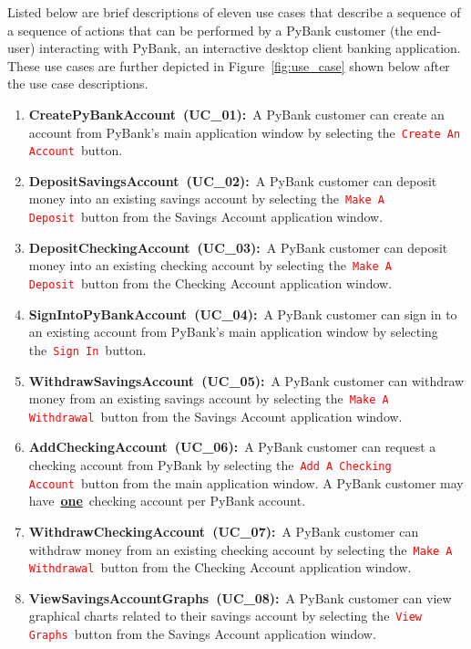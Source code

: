 Listed below are brief descriptions of eleven use cases that describe a sequence of a sequence of actions that can be performed by a PyBank customer (the end-user) interacting with PyBank, an interactive desktop client banking application. These use cases are further depicted in Figure~\ref{fig:use_case} shown below after the use case descriptions.

\begin{enumerate}[itemsep=1mm, parsep=0pt]
    \item {\textbf{CreatePyBankAccount~(UC\_01):}~A PyBank customer can create an account from PyBank's main application window by selecting the~\texttt{\textcolor{red}{Create An Account}}~button.}
    \item {\textbf{DepositSavingsAccount~(UC\_02):}~A PyBank customer can deposit money into an existing savings account by selecting the~\texttt{\textcolor{red}{Make A Deposit}}~button from the Savings Account application window.}
    \item {\textbf{DepositCheckingAccount~(UC\_03):}~A PyBank customer can deposit money into an existing checking account by selecting the~\texttt{\textcolor{red}{Make A Deposit}}~button from the Checking Account application window.}
    \item {\textbf{SignIntoPyBankAccount~(UC\_04):}~A PyBank customer can sign in to an existing account from PyBank's main application window by selecting the~\texttt{\textcolor{red}{Sign In}}~button.}
    \item {\textbf{WithdrawSavingsAccount~(UC\_05):}~A PyBank customer can withdraw money from an existing savings account by selecting the~\texttt{\textcolor{red}{Make A Withdrawal}}~button from the Savings Account application window.}
    \item {\textbf{AddCheckingAccount~(UC\_06):}~A PyBank customer can request a checking account from PyBank by selecting the~\texttt{\textcolor{red}{Add A Checking Account}}~button from the main application window. A PyBank customer may have~\textbf{\underline{one}}~checking account per PyBank account.}
    \item {\textbf{WithdrawCheckingAccount~(UC\_07):}~A PyBank customer can withdraw money from an existing checking account by selecting the~\texttt{\textcolor{red}{Make A Withdrawal}}~button from the Checking Account application window.}
    \item {\textbf{ViewSavingsAccountGraphs~(UC\_08):}~A PyBank customer can view graphical charts related to their savings account by selecting the~\texttt{\textcolor{red}{View Graphs}}~button from the Savings Account application window.}

\end{enumerate}
